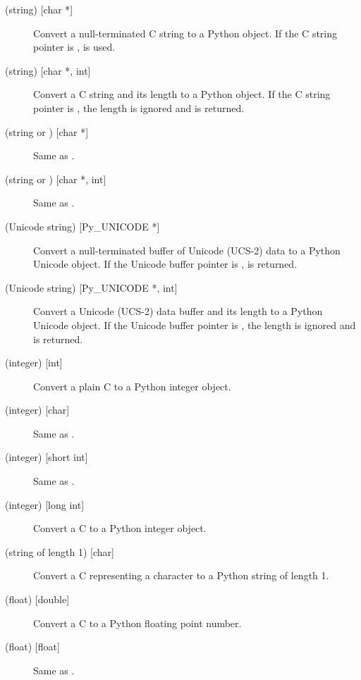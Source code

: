 \begin{description}

\item[ (string) {[char *]}]
Convert a null-terminated C string to a Python object.  If the C
string pointer is \NULL,  is used.

\item[ (string) {[char *, int]}]
Convert a C string and its length to a Python object.  If the C string
pointer is \NULL, the length is ignored and  is
returned.

\item[ (string or ) {[char *]}]
Same as .

\item[ (string or ) {[char *, int]}]
Same as .

\item[ (Unicode string) {[Py_UNICODE *]}]
Convert a null-terminated buffer of Unicode (UCS-2) data to a Python
Unicode object.  If the Unicode buffer pointer is \NULL,
 is returned.

\item[ (Unicode string) {[Py_UNICODE *, int]}]
Convert a Unicode (UCS-2) data buffer and its length to a Python
Unicode object.   If the Unicode buffer pointer is \NULL, the length
is ignored and  is returned.

\item[ (integer) {[int]}]
Convert a plain C  to a Python integer object.

\item[ (integer) {[char]}]
Same as .

\item[ (integer) {[short int]}]
Same as .

\item[ (integer) {[long int]}]
Convert a C  to a Python integer object.

\item[ (string of length 1) {[char]}]
Convert a C  representing a character to a Python string of
length 1.

\item[ (float) {[double]}]
Convert a C  to a Python floating point number.

\item[ (float) {[float]}]
Same as .


\end{description}
